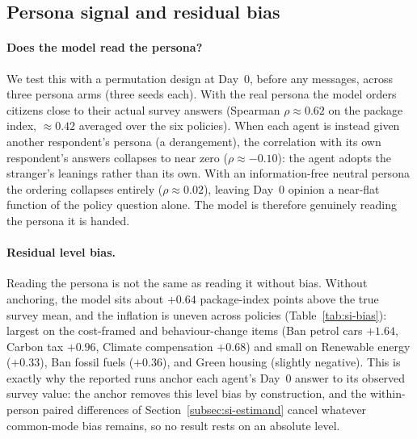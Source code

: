 \documentclass[pdflatex,sn-mathphys-num]{sn-jnl}%
\theoremstyle{thmstyleone}%
\theoremstyle{thmstyletwo}%
\theoremstyle{thmstylethree}%
\begin{document}
\subsection{Persona signal and residual bias}\label{sec:grounding}

\paragraph{Does the model read the persona?}
We test this with a permutation design at Day~0, before any messages, across three
persona arms (three seeds each). With the real persona the model orders citizens
close to their actual survey answers (Spearman $\rho\approx0.62$ on the package
index, $\approx0.42$ averaged over the six policies). When each agent is instead
given another respondent's persona (a derangement), the correlation with its own
respondent's answers collapses to near zero ($\rho\approx-0.10$): the agent adopts
the stranger's leanings rather than its own. With an information-free neutral
persona the ordering collapses entirely ($\rho\approx0.02$), leaving Day~0 opinion a
near-flat function of the policy question alone. The model is therefore genuinely
reading the persona it is handed.

\paragraph{Residual level bias.}
Reading the persona is not the same as reading it without bias. Without anchoring,
the model sits about $+0.64$ package-index points above the true survey mean, and
the inflation is uneven across policies (Table~\ref{tab:si-bias}): largest on the
cost-framed and behaviour-change items (Ban petrol cars $+1.64$, Carbon tax $+0.96$,
Climate compensation $+0.68$) and small on Renewable energy ($+0.33$), Ban fossil
fuels ($+0.36$), and Green housing (slightly negative). This is exactly why the
reported runs anchor each agent's Day~0 answer to its observed survey value: the
anchor removes this level bias by construction, and the within-person paired
differences of Section~\ref{subsec:si-estimand} cancel whatever common-mode bias
remains, so no result rests on an absolute level.
\end{document}
